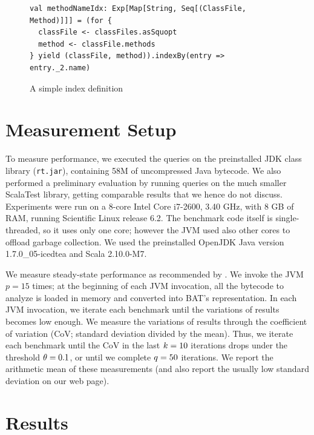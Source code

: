 \begin{figure}
\centering
\begin{lstlisting}
val methodNameIdx: Exp[Map[String, Seq[(ClassFile, Method)]]] = (for {
  classFile <- classFiles.asSquopt
  method <- classFile.methods
} yield (classFile, method)).indexBy(entry => entry._2.name)
\end{lstlisting}
\caption{A simple index definition}
\label{fig:indexes}
\end{figure}



\section{Measurement Setup}
To measure performance, we executed the queries on the preinstalled JDK class library (\texttt{rt.jar}), containing 58M of uncompressed Java bytecode.
We also performed a preliminary evaluation by running queries on the much smaller ScalaTest library, getting comparable results that we hence do not discuss.
Experiments were run on a 8-core Intel Core i7-2600, 3.40 GHz, with 8 GB of RAM, running Scientific Linux release 6.2.
The benchmark code itself is single-threaded, so it uses only one core; however the JVM used also other cores to offload garbage collection.
We used the preinstalled OpenJDK Java version 1.7.0\_05-icedtea and Scala 2.10.0-M7.

We measure steady-state performance as recommended by \citet{Georges07rigorousJavaPerformance}. We invoke the JVM $p = 15$ times;
at the beginning of each JVM invocation, all the bytecode to analyze is loaded in memory and converted into BAT's representation.
In each JVM invocation, we iterate each benchmark until the variations of results becomes low enough. We measure the variations of results through the coefficient of variation (CoV; standard deviation divided by the mean). Thus, we iterate each benchmark until the CoV in the last $k = 10$ iterations drops under the threshold $\theta = 0.1$, or until we complete $q = 50$ iterations.
We report the arithmetic mean of these measurements (and also report the usually low standard deviation on our web page).

\section{Results}

